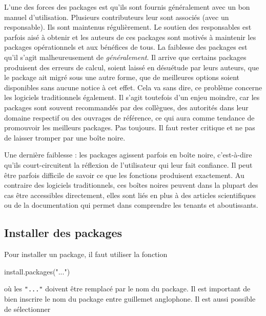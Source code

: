 \documentclass[
]{book}
\newenvironment{Shaded}{}{}
\newcommand{\FunctionTok}[1]{#1}
\newcommand{\NormalTok}[1]{#1}
\newcommand{\StringTok}[1]{#1}
\begin{document}
L'une des forces des packages est qu'ils sont fournis généralement avec un bon manuel d'utilisation. Plusieurs contributeurs leur sont associés (avec un responsable). Ils sont maintenus régulièrement. Le soutien des responsables est parfois aisé à obtenir et les auteurs de ces packages sont motivés à maintenir les packages opérationnels et aux bénéfices de tous. La faiblesse des packages est qu'il s'agit malheureusement de \emph{généralement}. Il arrive que certains packages produisent des erreurs de calcul, soient laissé en désuétude par leurs auteurs, que le package ait migré sous une autre forme, que de meilleures options soient disponibles sans aucune notice à cet effet. Cela va sans dire, ce problème concerne les logiciels traditionnels également. Il s'agit toutefois d'un enjeu moindre, car les packages sont souvent recommandés par des collègues, des autorités dans leur domaine respectif ou des ouvrages de référence, ce qui aura comme tendance de promouvoir les meilleurs packages. Pas toujours. Il faut rester critique et ne pas de laisser tromper par une boîte noire.

Une dernière faiblesse : les packages agissent parfois en boîte noire, c'est-à-dire qu'ils court-circuitent la réflexion de l'utilisateur qui leur fait confiance. Il peut être parfois difficile de savoir ce que les fonctions produisent exactement. Au contraire des logiciels traditionnels, ces boîtes noires peuvent dans la plupart des cas être accessibles directement, elles sont liés en plus à des articles scientifiques ou de la documentation qui permet dans comprendre les tenants et aboutissants.

\hypertarget{installer-des-packages}{%
\subsection{Installer des packages}\label{installer-des-packages}}

Pour installer un package, il faut utiliser la fonction

\begin{Shaded}
\begin{Highlighting}[]
\FunctionTok{install.packages}\NormalTok{(}\StringTok{"..."}\NormalTok{)}
\end{Highlighting}
\end{Shaded}

où les \texttt{"..."} doivent être remplacé par le nom du package. Il est important de bien inscrire le nom du package entre guillemet anglophone. Il est aussi possible de sélectionner
\end{document}
